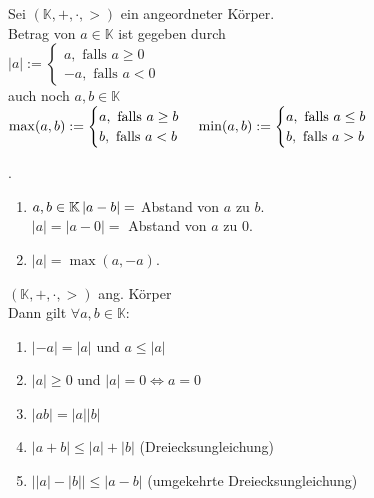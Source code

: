 \documentclass[../ana1.tex]{subfiles}
\begin{document}
\begin{defi}[Betrag]
	Sei $(\mathbb{K}, +,\cdot,>)$ ein angeordneter Körper.\\
	Betrag von $a\in\mathbb{K}$ ist gegeben durch\\
	$\left| a\right| :=
		\begin{cases}
			a, \text{ falls } a\geq 0 \\
			-a, \text{ falls }a<0
		\end{cases}$\\
	auch noch $a,b\in \mathbb{K}$\\
	$\max(a,b) :=
		\begin{cases}
			a, \text{ falls } a\geq b \\
			b, \text{ falls } a < b
		\end{cases}\\
		\min(a,b) :=
		\begin{cases}
			a, \text{ falls } a\leq b \\
			b, \text{ falls } a > b
		\end{cases}$\\
\end{defi}
\begin{bem} . %
	\begin{enumerate}
		\item $a,b\in \mathbb{K}\\
			      \left| a-b\right| = $ Abstand von $a$ zu $b$.\\
		      $\left| a\right| = \left| a-0\right| = $ Abstand von $a$ zu $0$.
		\item $\left| a\right| = \max(a, -a)$.
	\end{enumerate}
\end{bem}
\begin{satz}
	$(\mathbb{K},+,\cdot,>)$ ang. Körper\\
	Dann gilt $\forall a,b\in\mathbb{K}:$
	\begin{enumerate}
		\item $\left|-a\right| = \left| a\right|$ und $a\leq\left|a\right|$
		\item $\left| a\right| \geq 0$ und $\left| a\right| = 0 \Leftrightarrow a = 0$
		\item $\left| ab\right| = \left| a\right| \left| b\right|$
		\item $\left| a+b\right| \leq \left| a\right| + \left|b\right|$ (Dreiecksungleichung)
		\item $\left|\left|a\right|-\left|b\right|\right| \leq \left| a-b\right|$ (umgekehrte Dreiecksungleichung)
	\end{enumerate}
\end{satz}
\end{document}

